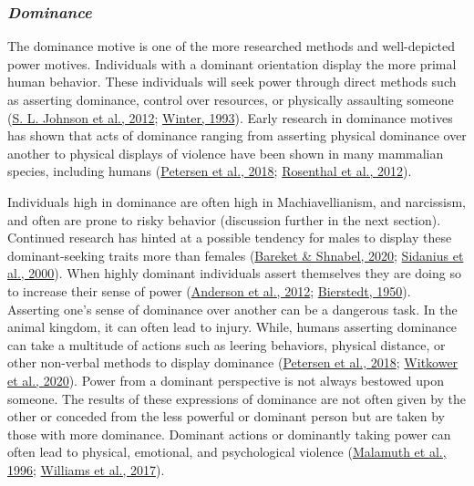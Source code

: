\documentclass[
  donotrepeattitle,doc, 12pt, a4paper,floatsintext]{apa7}
\begin{document}
\hypertarget{dominance}{%
\subsubsection{\texorpdfstring{\emph{Dominance}}{Dominance}}\label{dominance}}

The dominance motive is one of the more researched methods and well-depicted power motives. Individuals with a dominant orientation display the more primal human behavior. These individuals will seek power through direct methods such as asserting dominance, control over resources, or physically assaulting someone (\protect\hyperlink{ref-johnson2012}{S. L. Johnson et al., 2012}; \protect\hyperlink{ref-winter1993}{Winter, 1993}). Early research in dominance motives has shown that acts of dominance ranging from asserting physical dominance over another to physical displays of violence have been shown in many mammalian species, including humans (\protect\hyperlink{ref-petersen2018}{Petersen et al., 2018}; \protect\hyperlink{ref-rosenthal2012}{Rosenthal et al., 2012}).

Individuals high in dominance are often high in Machiavellianism, and narcissism, and often are prone to risky behavior (discussion further in the next section). Continued research has hinted at a possible tendency for males to display these dominant-seeking traits more than females (\protect\hyperlink{ref-bareket2020}{Bareket \& Shnabel, 2020}; \protect\hyperlink{ref-sidanius2000}{Sidanius et al., 2000}). When highly dominant individuals assert themselves they are doing so to increase their sense of power (\protect\hyperlink{ref-anderson2012}{Anderson et al., 2012}; \protect\hyperlink{ref-bierstedt1950}{Bierstedt, 1950}). Asserting one's sense of dominance over another can be a dangerous task. In the animal kingdom, it can often lead to injury. While, humans asserting dominance can take a multitude of actions such as leering behaviors, physical distance, or other non-verbal methods to display dominance (\protect\hyperlink{ref-petersen2018}{Petersen et al., 2018}; \protect\hyperlink{ref-witkower2020}{Witkower et al., 2020}). Power from a dominant perspective is not always bestowed upon someone. The results of these expressions of dominance are not often given by the other or conceded from the less powerful or dominant person but are taken by those with more dominance. Dominant actions or dominantly taking power can often lead to physical, emotional, and psychological violence (\protect\hyperlink{ref-malamuth1996}{Malamuth et al., 1996}; \protect\hyperlink{ref-williams2017}{Williams et al., 2017}).
\end{document}
